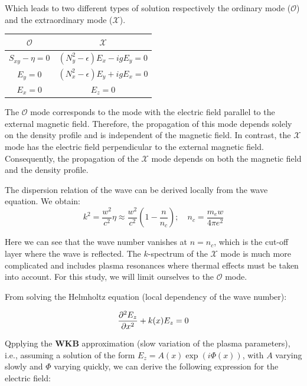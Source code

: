 \documentclass[11pt,openany]{report}
\begin{document}
\begin{multicols}{2}
    Which leads to two different types of solution respectively the ordinary mode ($\mathcal{O}$) and the extraordinary mode ($\mathcal{X}$).
    \setlength{\tabcolsep}{18pt}
    \renewcommand{\arraystretch}{1.5}
    \begin{center}
        \begin{tabular}{|| c  | c||}
            \hline
            $\mathcal{O}$       & $\mathcal{X}$                       \\
            \hline\hline
            $S_{xy} - \eta = 0$ & $(N_y^2 - \epsilon)E_x - igE_y = 0$ \\
            $E_y = 0$           & $(N_x^2 - \epsilon)E_y + igE_x = 0$ \\
            $E_x = 0$           & $E_z = 0$                           \\
            \hline
        \end{tabular}
    \end{center}

    The $\mathcal{O}$ mode corresponds to the mode with the electric field parallel to the external magnetic field. Therefore, the propagation of this mode depends solely on the density profile and is independent of the magnetic field. In contrast, the $\mathcal{X}$ mode has the electric field perpendicular to the external magnetic field. Consequently, the propagation of the $\mathcal{X}$ mode depends on both the magnetic field and the density profile.

    The dispersion relation of the wave can be derived locally from the wave equation. We obtain:
    \begin{equation}
        k^2 = \frac{w^2}{c^2} \eta \approx \frac{w^2}{c^2}\left(1 - \frac{n}{n_c}\right); \quad n_c = \frac{m_ew}{4 \pi e^2}
        \label{eq:Dispersion_relation}
    \end{equation}

    Here we can see that the wave number vanishes at \( n = n_c \), which is the cut-off layer where the wave is reflected. The \( k \)-spectrum of the $\mathcal{X}$ mode is much more complicated and includes plasma resonances where thermal effects must be taken into account. For this study, we will limit ourselves to the $\mathcal{O}$ mode.

    From solving the Helmholtz equation (local dependency of the wave number):

    $$
        \pdv[2]{E_z}{x} + k(x)E_z = 0
    $$

    Qpplying the \textbf{WKB} approximation (slow variation of the plasma parameters), i.e., assuming a solution of the form \( E_z = A(x) \exp(i\Phi(x)) \), with \( A \) varying slowly and \( \Phi \) varying quickly, we can derive the following expression for the electric field:


\end{multicols}
\end{document}

